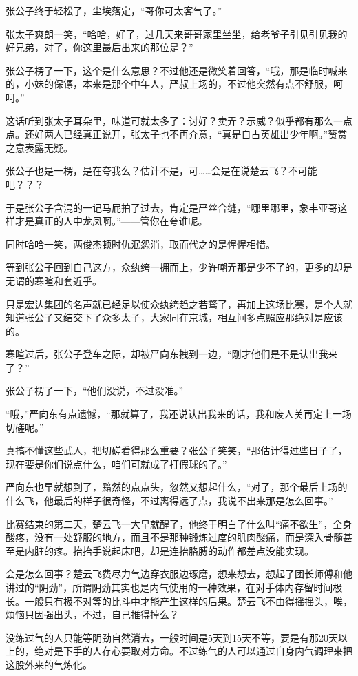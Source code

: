 张公子终于轻松了，尘埃落定，“哥你可太客气了。”

张太子爽朗一笑，“哈哈，好了，过几天来哥哥家里坐坐，给老爷子引见引见我的好兄弟，对了，你这里最后出来的那位是？”

张公子楞了一下，这个是什么意思？不过他还是微笑着回答，“哦，那是临时喊来的，小妹的保镖，本来是那个中年人，严叔上场的，不过他突然有点不舒服，呵呵。”

这话听到张太子耳朵里，味道可就太多了：讨好？卖弄？示威？似乎都有那么一点点。还好两人已经真正说开，张太子也不再介意，“真是自古英雄出少年啊。”赞赏之意表露无疑。

张公子也是一楞，是在夸我么？估计不是，可……会是在说楚云飞？不可能吧？？？

于是张公子含混的一记马屁拍了过去，肯定是严丝合缝，“哪里哪里，象丰亚哥这样才是真正的人中龙凤啊。”——管你在夸谁呢。

同时哈哈一笑，两俊杰顿时仇泯怨消，取而代之的是惺惺相惜。

等到张公子回到自己这方，众纨绔一拥而上，少许嘲弄那是少不了的，更多的却是无谓的寒暄和套近乎。

只是宏达集团的名声就已经足以使众纨绔趋之若骛了，再加上这场比赛，是个人就知道张公子又结交下了众多太子，大家同在京城，相互间多点照应那绝对是应该的。

寒暄过后，张公子登车之际，却被严向东拽到一边，“刚才他们是不是认出我来了？”

张公子楞了一下，“他们没说，不过没准。”

“哦，”严向东有点遗憾，“那就算了，我还说认出我来的话，我和废人关再定上一场切磋呢。”

真搞不懂这些武人，把切磋看得那么重要？张公子笑笑，“那估计得过些日子了，现在要是你们说点什么，咱们可就成了打假球的了。”

严向东也早就想到了，黯然的点点头，忽然又想起什么，“对了，那个最后上场的什么飞，他最后的样子很奇怪，不过离得远了点，我说不出来那是怎么回事。”

比赛结束的第二天，楚云飞一大早就醒了，他终于明白了什么叫“痛不欲生”，全身酸疼，没有一处舒服的地方，而且不是那种锻炼过度的肌肉酸痛，而是深入骨髓甚至是内脏的疼。抬抬手说起床吧，却是连抬胳膊的动作都差点没能实现。

会是怎么回事？楚云飞费尽力气边穿衣服边琢磨，想来想去，想起了团长师傅和他讲过的“阴劲”，所谓阴劲其实也是内气使用的一种效果，在对手体内存留时间极长。一般只有极不对等的比斗中才能产生这样的后果。楚云飞不由得摇摇头，唉，烦恼只因强出头，不过，自己推得掉么？

没练过气的人只能等阴劲自然消去，一般时间是5天到15天不等，要是有那20天以上的，绝对是下手的人存心要取对方命。不过练气的人可以通过自身内气调理来把这股外来的气炼化。

